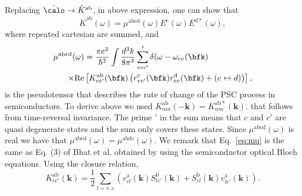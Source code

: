 \documentclass[prb,11pt,tightenlines,twocolumn,aps]{revtex4-1}
\begin{document}
Replacing  $\hat\calo \rightarrow \hat{K}^{\mathrm{ab}}$, in 
above expression, one can show that
\begin{equation}
\dot{K}^{\mathrm{ab}}(\omega) =
\mu^{\mathrm{abcd}}(\omega)
E^{\mathrm{c}}(\omega) E^{\mathrm{d*}}(\omega),
\label{eq:dotk}
\end{equation}
where repeated cartesian are summed, and 
\begin{equation}\label{eq:mu}
\begin{aligned}
\mu^{\mathrm{abcd}}  (\omega) &
=
\frac{\pi e^{2}}{\hbar^{2}} \int 
\frac{d^{3}k}{8 \pi^{3}} \sum'_{vcc'}
  \delta(\omega-\omega_{cv}(\bfk) 
\\
\times\mathrm{Re} & \left[ K^{\mathrm{ab}}_{cc'}(\bfk) 
\left(  
r^{\mathrm{c}}_{vc'}(\bfk)   
r^{\mathrm{d}}_{cv }(\bfk)  +
(c \leftrightarrow d)  
\right) 
\right]
,  
\end{aligned}
\end{equation} 
is the pseudotensor that describes the rate of change of the  PSC process in
semiconductors. To derive above we used
$
K^{\mathrm{ab}}_{nm}(\mathbf{-k}) = K^{\mathrm{ab*}}_{nm}(\mathbf{k}). 
$
that follows from time-reversal invariance. The prime $'$ in the sum means that
$c$ and $c'$ are quasi degenerate states and the sum only covers these states.
Since $\mu^{\mathrm{abcd}}(\omega)$ is real we have that
$\mu^{\mathrm{abcd}}(\omega) =
\mu^{\mathrm{abdc}}(\omega)$. 
We remark that Eq.~\eqref{eq:mu} 
 is the same as Eq. (3) of Bhat et al.\cite{bhatPRL05}
obtained by using the semiconductor optical Bloch equations.
Using the closure relation,
\begin{equation}
K^{\mathrm{ab}}_{cc'}(\mathbf{k}) = \frac{1}{2}
\sum_{l=v,c}
\left(v^{\mathrm{a}}_{cl}(\mathbf{k})S^{\mathrm{b}}_{lc'}(\mathbf{k})
+S^{\mathrm{b}}_{cl}(\mathbf{k}) v^{\mathrm{a}}_{lc'}(\mathbf{k})
\right)
.
\label{eq:velspimatelem}
\end{equation}

\end{document}
